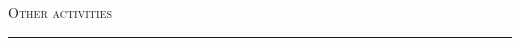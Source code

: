 \documentclass[a4paper,10pt]{article}
\newcommand{\mediumtitle}[1]{
	\vspace{0.2cm}
	{\noindent
	\Large \textsc{#1}\\[-2ex]
	\hrule
	\vspace{0.2cm}}
}
\newenvironment{doubletablelist}
{
	\vspace{-0.2cm}
	\begin{longtable}[!h]{AB}}{\end{longtable}
}
\newcommand{\dtlist}[2]{
\hspace{-3cm}
\noindent
	\begin{minipage}{0.24\textwidth}
	\begin{flushright}
	\textsc{#1}
	\end{flushright}
	\end{minipage}
	& #2\\[0.2cm]
}
\newcommand{\minusitem}{\item[-]}
\begin{document}
%


\mediumtitle{Other activities}

\end{document}
